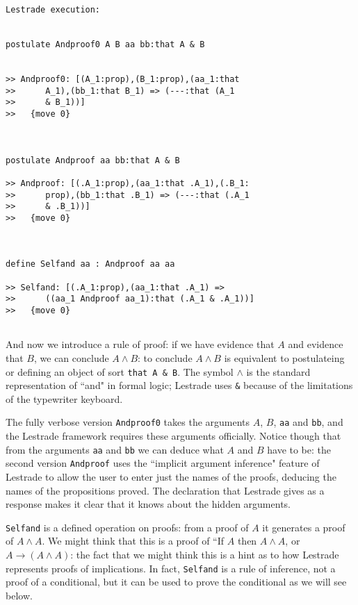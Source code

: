 \documentclass[12pt]{article}
\begin{document}
\begin{verbatim}Lestrade execution:


postulate Andproof0 A B aa bb:that A & B


>> Andproof0: [(A_1:prop),(B_1:prop),(aa_1:that
>>      A_1),(bb_1:that B_1) => (---:that (A_1
>>      & B_1))]
>>   {move 0}



postulate Andproof aa bb:that A & B

>> Andproof: [(.A_1:prop),(aa_1:that .A_1),(.B_1:
>>      prop),(bb_1:that .B_1) => (---:that (.A_1
>>      & .B_1))]
>>   {move 0}



define Selfand aa : Andproof aa aa

>> Selfand: [(.A_1:prop),(aa_1:that .A_1) =>
>>      ((aa_1 Andproof aa_1):that (.A_1 & .A_1))]
>>   {move 0}


\end{verbatim}

And now we introduce a rule of proof:  if we have evidence that $A$ and evidence that $B$, we can conclude $A \wedge B$:  to conclude $A \wedge B$ is equivalent to postulateing or defining an object of sort {\tt that A \& B}.  The symbol $\wedge$ is the standard representation of ``and" in formal logic; Lestrade uses {\tt \&} because of the limitations of the typewriter keyboard.

The fully verbose version {\tt Andproof0} takes the arguments $A$, $B$, {\tt aa} and {\tt bb}, and the Lestrade framework requires these arguments officially.  Notice though that from the arguments {\tt aa} and {\tt bb} we can deduce what $A$ and $B$ have to be:  the second version {\tt Andproof} uses the
``implicit argument inference" feature of Lestrade to allow the user to enter just the names of the proofs, deducing the names of the propositions proved.  The declaration that Lestrade gives as a response makes it clear that it knows about the hidden arguments.

{\tt Selfand} is a defined operation on proofs:  from a proof of $A$ it generates a proof of $A \wedge A$.  We might think that this is a proof of ``If $A$ then $A\wedge A$, or $A  \rightarrow (A\wedge A)$:  the fact that we might think this is a hint as to how Lestrade represents proofs of implications.  In fact, {\tt Selfand} is a rule of inference, not a proof of a conditional, but it can be used to prove the conditional as we will see below.
\end{document}
